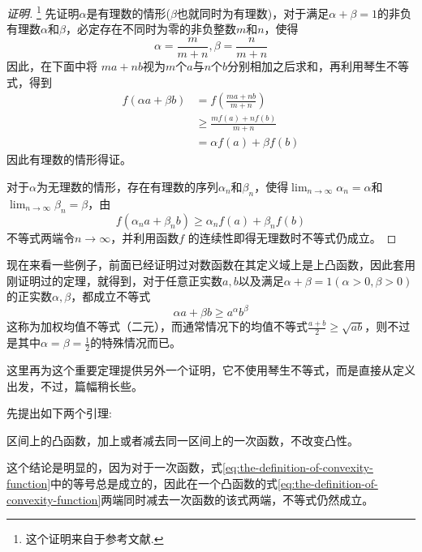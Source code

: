 \begin{proof}[证明]\footnote{这个证明来自于参考文献\cite{the-secret-of-inequality}.}
  先证明$\alpha$是有理数的情形($\beta$也就同时为有理数)，对于满足$\alpha+\beta=1$的非负有理数$\alpha$和$\beta$，必定存在不同时为零的非负整数$m$和$n$，使得
  \begin{equation*}
    \alpha = \frac{m}{m+n}, \beta = \frac{n}{m+n}
  \end{equation*}
因此，在下面中将 $ma+nb$视为$m$个$a$与$n$个$b$分别相加之后求和，再利用琴生不等式，得到
\begin{equation*}
  \begin{split}
    f(\alpha a + \beta b) & = f \left( \frac{ma+nb}{m+n} \right) \\
& \geqslant \frac{mf(a)+nf(b)}{m+n} \\
& = \alpha f(a) + \beta f(b)
  \end{split}
\end{equation*}
因此有理数的情形得证。

对于$\alpha$为无理数的情形，存在有理数的序列$\alpha_n$和$\beta_n$，使得$\lim_{n\to\infty}\alpha_n=\alpha$和$\lim_{n\to\infty}\beta_n=\beta$，由
\begin{equation*}
    f(\alpha_n a + \beta_n b) \geqslant \alpha_n f(a) + \beta_n f(b) 
\end{equation*}
不等式两端令$n\to\infty$，并利用函数$f$ 的连续性即得无理数时不等式仍成立。
\end{proof}

现在来看一些例子，前面已经证明过对数函数在其定义域上是上凸函数，因此套用刚证明过的定理，就得到，对于任意正实数$a,b$以及满足$\alpha+\beta=1(\alpha>0,\beta>0)$的正实数$\alpha,\beta$，都成立不等式
\begin{equation}
  \label{eq:binary-neq-for-mean-with-weight}
\alpha a + \beta b \geqslant a^{\alpha}b^{\beta}
\end{equation}
这称为加权均值不等式（二元），而通常情况下的均值不等式$\frac{a+b}{2}\geqslant \sqrt{ab}$，则不过是其中$\alpha=\beta=\frac{1}{2}$的特殊情况而已。

这里再为这个重要定理提供另外一个证明，它不使用琴生不等式，而是直接从定义出发，不过，篇幅稍长些。

先提出如下两个引理:
\begin{lemma}
  \label{lemma:add-linear-fun-to-convexity-funtion}
  区间上的凸函数，加上或者减去同一区间上的一次函数，不改变凸性。
\end{lemma}
这个结论是明显的，因为对于一次函数，式\ref{eq:the-definition-of-convexity-function}中的等号总是成立的，因此在一个凸函数的式\ref{eq:the-definition-of-convexity-function}两端同时减去一次函数的该式两端，不等式仍然成立。

